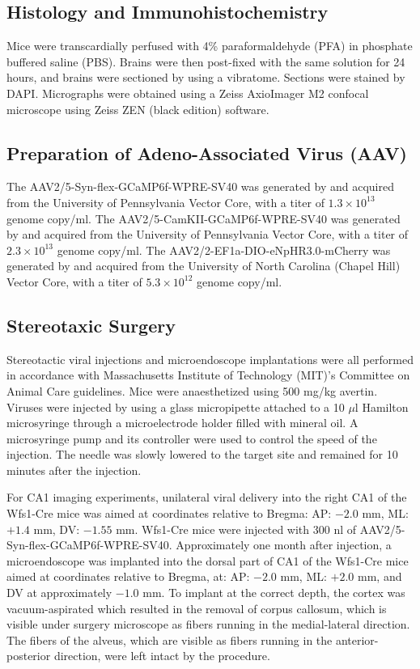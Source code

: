 \subsection{Histology and Immunohistochemistry}

Mice were transcardially perfused with 4\% paraformaldehyde (PFA) in phosphate buffered saline (PBS). Brains were then post-fixed with the same solution for 24 hours, and brains were sectioned by using a vibratome. Sections were stained by DAPI. Micrographs were obtained using a Zeiss AxioImager M2 confocal microscope using Zeiss ZEN (black edition) software.

\subsection{Preparation of Adeno-Associated Virus (AAV)}

The AAV2/5-Syn-flex-GCaMP6f-WPRE-SV40 was generated by and acquired from the University of Pennsylvania Vector Core, with a titer of $1.3 \times 10^{13}$ genome copy/ml. The AAV2/5-CamKII-GCaMP6f-WPRE-SV40 was generated by and acquired from the University of Pennsylvania Vector Core, with a titer of $2.3 \times 10^{13}$ genome copy/ml. The AAV2/2-EF1a-DIO-eNpHR3.0-mCherry was generated by and acquired from the University of North Carolina (Chapel Hill) Vector Core, with a titer of $5.3 \times 10^{12}$ genome copy/ml.

\subsection{Stereotaxic Surgery}

Stereotactic viral injections and microendoscope implantations were all performed in accordance with Massachusetts Institute of Technology (MIT)'s Committee on Animal Care guidelines. Mice were anaesthetized using 500 mg/kg avertin. Viruses were injected by using a glass micropipette attached to a 10 $\mu$l Hamilton microsyringe through a microelectrode holder filled with mineral oil. A microsyringe pump and its controller were used to control the speed of the injection. The needle was slowly lowered to the target site and remained for 10 minutes after the injection.

For CA1 imaging experiments, unilateral viral delivery into the right CA1 of the Wfs1-Cre mice was aimed at coordinates relative to Bregma: AP: $-2.0$ mm, ML: $+1.4$ mm, DV: $-1.55$ mm. Wfs1-Cre mice were injected with 300 nl of AAV2/5-Syn-flex-GCaMP6f-WPRE-SV40. Approximately one month after injection, a microendoscope was implanted into the dorsal part of CA1 of the Wfs1-Cre mice aimed at coordinates relative to Bregma, at: AP: $-2.0$ mm, ML: $+2.0$ mm, and DV at approximately $-1.0$ mm. To implant at the correct depth, the cortex was vacuum-aspirated which resulted in the removal of corpus callosum, which is visible under surgery microscope as fibers running in the medial-lateral direction. The fibers of the alveus, which are visible as fibers running in the anterior-posterior direction, were left intact by the procedure.

